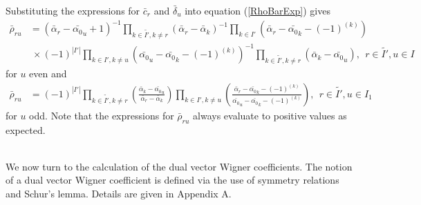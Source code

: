 \documentclass[12pt]{article}
\begin{document}
Substituting the expressions for $\bar{c}_r$ and $\bar{\delta}_u$ into equation 
 (\ref{RhoBarExp}) gives
\begin{align*}
\bar{\rho}_{ru} &= (\bar{\alpha}_r-\bar{\alpha_0}_u + 1)^{-1}\prod_{k\in \tilde{I'},k\neq r} \left(\bar{\alpha}_r - \bar{\alpha}_k \right)^{-1}\prod_{k\in
I'} \left(\bar{\alpha}_r - \bar{\alpha_0}_k - (-1)^{(k)}\right) \\
& ~\times (-1)^{|I'|} \prod_{k\in I',k\neq u} \left(\bar{\alpha_0}_u - \bar{\alpha_0}_k -
(-1)^{(k)}\right)^{-1}\prod_{k\in\tilde{I'},k \neq r} \left(\bar{\alpha}_k - \bar{\alpha_0}_u \right),\ \ r\in \tilde{I'},u\in I 
\end{align*}
for $u$ even and
\begin{align*}
\bar{\rho}_{ru} &= (-1)^{|I'|} \prod_{k\in \tilde{I'},k\neq r} 
\left(
\frac 
{\bar{\alpha}_k - \bar{\alpha_0}_u  }
{\bar{\alpha}_r - \bar{\alpha}_k }
\right)
\prod_{k\in I',k \neq u} 
\left(
\frac
{ \bar{\alpha}_r - \bar{\alpha_0}_k - (-1)^{(k)} }
{\bar{\alpha_0}_u - \bar{\alpha_0}_k - (-1)^{(k)} }
\right)
,\ \ r\in \tilde{I'},u\in I_1
\end{align*}
for $u$ odd. Note that the expressions for $\bar{\rho}_{ru}$ always evaluate to positive values as expected.


~~\\
We now turn to the calculation of the dual vector Wigner coefficients.
The notion of a dual vector Wigner coefficient is defined via the use of symmetry relations and Schur's lemma. Details are given in Appendix A.
\end{document}
